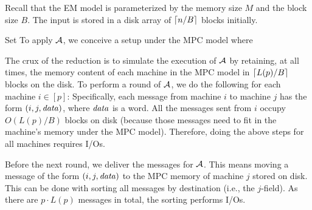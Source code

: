 \vgap

Recall that the EM model is parameterized by the memory size $M$ and the block size $B$. The input is stored in a disk array of $\lc n/B \rc$ blocks initially.

\vgap

Set
To apply $\A$, we conceive a setup under the MPC model where

The crux of the reduction is to simulate the execution of $\A$ by  retaining, at all times, the memory content of each machine in the MPC model in $\lc L(p)/B \rc$ blocks on the disk. To perform a round of $\A$, we do the following for each machine $i \in [p]$:
Specifically, each message from machine $i$ to machine $j$ has the form $(i, j, \mit{data})$, where $\mit{data}$ is a word. All the messages sent from $i$ occupy $O(L(p)/B)$ blocks on disk (because those messages need to fit in the machine's memory under the MPC model). Therefore, doing the above steps for all machines requires
I/Os.

\vgap

Before the next round, we deliver the messages for $\A$. This means moving a message of the form $(i, j, \mit{data})$ to the MPC memory of machine $j$ stored on disk. This can be done with sorting all messages by destination (i.e., the $j$-field). As there are $p \cdot L(p)$ messages in total, the sorting performs
I/Os.

\vgap

